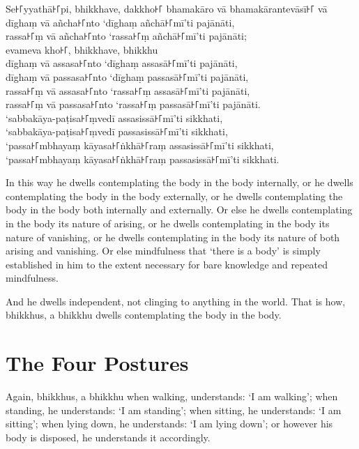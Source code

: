 Se꜔꜒yyathā꜔꜒pi, bhikkhave, dakkho꜔꜒ bhamakāro vā bhamakārantevāsī꜔꜒ vā\\
dīghaṃ vā añcha꜔꜒nto ‘dīghaṃ añchā꜔꜒mī’ti pajānāti,\\
rassa꜔꜒ṃ vā añcha꜔꜒nto ‘rassa꜔꜒ṃ añchā꜔꜒mī’ti pajānāti;\\
evameva kho꜔꜒, bhikkhave, bhikkhu\\
dīghaṃ vā assasa꜔꜒nto ‘dīghaṃ assasā꜔꜒mī’ti pajānāti,\\
dīghaṃ vā passasa꜔꜒nto ‘dīghaṃ passasā꜔꜒mī’ti pajānāti,\\
rassa꜔꜒ṃ vā assasa꜔꜒nto ‘rassa꜔꜒ṃ assasā꜔꜒mī’ti pajānāti,\\
rassa꜔꜒ṃ vā passasa꜔꜒nto ‘rassa꜔꜒ṃ passasā꜔꜒mī’ti pajānāti.\\
‘sabbakāya-paṭisa꜔꜒ṃvedī assasissā꜔꜒mī’ti sikkhati,\\
‘sabbakāya-paṭisa꜔꜒ṃvedī passasissā꜔꜒mī’ti sikkhati,\\
‘passa꜔꜒mbhayaṃ kāyasa꜔꜒ṅkhā꜔꜒raṃ assasissā꜔꜒mī’ti sikkhati,\\
‘passa꜔꜒mbhayaṃ kāyasa꜔꜒ṅkhā꜔꜒raṃ passasissā꜔꜒mī’ti sikkhati.

\englishPage

In this way he dwells contemplating the body in the body internally, or he
dwells contemplating the body in the body externally, or he dwells contemplating
the body in the body both internally and externally. Or else he dwells
contemplating in the body its nature of arising, or he dwells contemplating in
the body its nature of vanishing, or he dwells contemplating in the body its
nature of both arising and vanishing. Or else mindfulness that ‘there is a body’
is simply established in him to the extent necessary for bare knowledge and
repeated mindfulness.

And he dwells independent, not clinging to anything in the world. That is how,
bhikkhus, a bhikkhu dwells contemplating the body in the body.


\section{The Four Postures}

Again, bhikkhus, a bhikkhu when walking, understands: ‘I am walking’; when
standing, he understands: ‘I am standing’; when sitting, he understands: ‘I am
sitting’; when lying down, he understands: ‘I am lying down’; or however his
body is disposed, he understands it accordingly.

